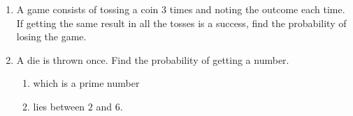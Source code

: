 \begin{enumerate}
\item A game consists of tossing a coin $3$ times and noting the outcome each time. If getting the same result in all the tosses is a success, find the probability of losing the game.
\item A die is thrown once. Find the probability of getting a number.
\begin{enumerate}[label={\Roman*.}]
\item which is a prime number
\item lies between $2$ and $6$.
\end{enumerate}
\end{enumerate} 
